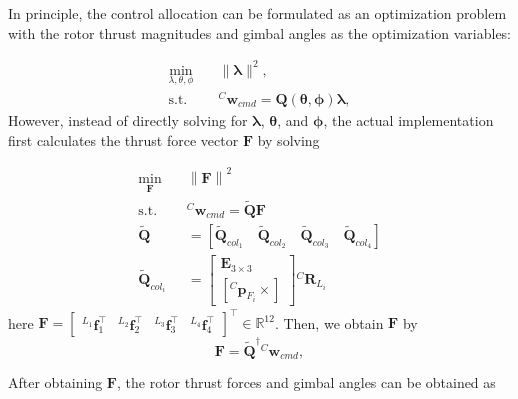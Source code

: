 In principle, the control allocation can be formulated as an optimization problem with the rotor thrust magnitudes and gimbal angles as the optimization variables:



\begin{equation}
\label{eq:thrust least dragon}
\begin{aligned}
\min_{\lambda,\theta,\phi}\quad & \|\boldsymbol{\lambda}\|^2, \\
\text{s.t.}\quad & ^C\!\boldsymbol{w}_{cmd}
= \boldsymbol{Q}(\boldsymbol{\theta},\boldsymbol{\phi})\boldsymbol{\lambda},
\end{aligned}
\end{equation}
However, instead of directly solving for $\boldsymbol{\lambda}$, $\boldsymbol{\theta}$, and $\boldsymbol{\phi}$,
the actual implementation first calculates the thrust force vector $\boldsymbol{F}$ by solving


\begin{equation}
\label{eq:thrust least2 dragon}
\begin{aligned}
\min_{\boldsymbol{F}} \quad &
\left\| \boldsymbol{F} \right\|^2\\
\text{s.t.} \quad &^C\!\boldsymbol{w}_{cmd}=\tilde{\boldsymbol{Q}}\boldsymbol{F}\\
\tilde{\boldsymbol{Q}}&=\left[
\tilde{\boldsymbol{Q}}_{col_1}
\quad
\tilde{\boldsymbol{Q}}_{col_2}
\quad
\tilde{\boldsymbol{Q}}_{col_3}
\quad
\tilde{\boldsymbol{Q}}_{col_{4}}
\right]\\
\tilde{\boldsymbol{Q}}_{col_i}&=
\begin{bmatrix}
\boldsymbol{E}_{3 \times 3}
\\
\left[
{}^{C}
\boldsymbol{p}_{F_i}
\times
\right]
\end{bmatrix}
{}^{C}
\boldsymbol{R}_{L_i}
\end{aligned}
\end{equation}
here $\boldsymbol{F}
=\begin{bmatrix}
{}^{L_1}\boldsymbol{f}_1^{\top}&{}^{L_2}\boldsymbol{f}_2^{\top}&{}^{L_3}\boldsymbol{f}_3^{\top}&{}^{L_4}\boldsymbol{f}_{4}^{\top}
\end{bmatrix}^{\top} \in \mathbb{R}^{12}$.
Then, we obtain $\boldsymbol{F}$ by
\begin{equation}
\label{eq:thrust least3 dragon}
\boldsymbol{F}=\tilde{\boldsymbol{Q}}^{\dagger}{}^C\!\boldsymbol{w}_{cmd},
\end{equation}


After obtaining $\boldsymbol{F}$, the rotor thrust forces and gimbal angles can be obtained as

